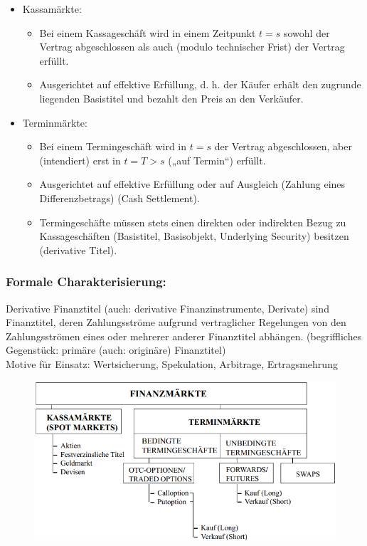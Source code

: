 \documentclass[12pt]{report}
\theoremstyle{dotless}
\theoremstyle{definition}
\begin{document}
\begin{itemize}
\item Kassamärkte:
\begin{itemize}
\item Bei einem Kassageschäft wird in einem Zeitpunkt $t = s$ sowohl der Vertrag
abgeschlossen als auch (modulo technischer Frist) der Vertrag erfüllt.
\item Ausgerichtet auf effektive Erfüllung, d. h. der Käufer erhält den zugrunde
liegenden Basistitel und bezahlt den Preis an den Verkäufer.
\end{itemize}
\item Terminmärkte:
\begin{itemize}
\item Bei einem Termingeschäft wird in $t = s$ der Vertrag abgeschlossen, aber
(intendiert) erst in $t = T > s$ („auf Termin“) erfüllt.
\item Ausgerichtet auf effektive Erfüllung oder auf Ausgleich (Zahlung eines
Differenzbetrags) (Cash Settlement).
\item Termingeschäfte müssen stets einen direkten oder indirekten Bezug zu
Kassageschäften (Basistitel, Basisobjekt, Underlying Security) besitzen
(derivative Titel).
\end{itemize}
\end{itemize}



\subsubsection{Formale Charakterisierung:}
Derivative Finanztitel (auch: derivative Finanzinstrumente, Derivate) sind
Finanztitel, deren Zahlungsströme aufgrund vertraglicher Regelungen von den
Zahlungsströmen eines oder mehrerer anderer Finanztitel abhängen. (begriffliches Gegenstück: primäre (auch: originäre) Finanztitel)\\
Motive für Einsatz: Wertsicherung, Spekulation, Arbitrage, Ertragsmehrung

\begin{figure}[ht]
	\centering
	\includegraphics[width= \textwidth]{Bilder/Finanzmarkt.png}
\end{figure}
\end{document}
